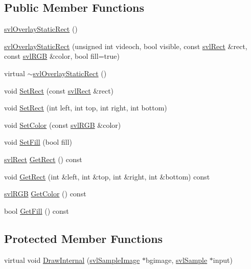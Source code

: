 \subsection*{Public Member Functions}
\begin{DoxyCompactItemize}
\item 
\hyperlink{classsvl_overlay_static_rect_ae91b11cd992ad04fa407f4ecadae7f56}{svl\+Overlay\+Static\+Rect} ()
\item 
\hyperlink{classsvl_overlay_static_rect_ae94a36da4e9d1ab24c1ffa94e637924b}{svl\+Overlay\+Static\+Rect} (unsigned int videoch, bool visible, const \hyperlink{structsvl_rect}{svl\+Rect} \&rect, const \hyperlink{structsvl_r_g_b}{svl\+R\+G\+B} \&color, bool fill=true)
\item 
virtual \hyperlink{classsvl_overlay_static_rect_a7369b65a5b1b92bc239917d9f57ebdb7}{$\sim$svl\+Overlay\+Static\+Rect} ()
\item 
void \hyperlink{classsvl_overlay_static_rect_a8ab4667a07aa9f2c26a50b28f3425ff4}{Set\+Rect} (const \hyperlink{structsvl_rect}{svl\+Rect} \&rect)
\item 
void \hyperlink{classsvl_overlay_static_rect_a5ae889711bfcec494cea4447caeebf26}{Set\+Rect} (int left, int top, int right, int bottom)
\item 
void \hyperlink{classsvl_overlay_static_rect_adc4f4ff79cc67a4a2378583df635928f}{Set\+Color} (const \hyperlink{structsvl_r_g_b}{svl\+R\+G\+B} \&color)
\item 
void \hyperlink{classsvl_overlay_static_rect_a5676e799b53a8416e67cfe0b262ee706}{Set\+Fill} (bool fill)
\item 
\hyperlink{structsvl_rect}{svl\+Rect} \hyperlink{classsvl_overlay_static_rect_a622702879d0a14e1dd167093c5e65454}{Get\+Rect} () const 
\item 
void \hyperlink{classsvl_overlay_static_rect_a2cf3e7be41151471f313f733146dd0cd}{Get\+Rect} (int \&left, int \&top, int \&right, int \&bottom) const 
\item 
\hyperlink{structsvl_r_g_b}{svl\+R\+G\+B} \hyperlink{classsvl_overlay_static_rect_aa863745fd6a47df7f841def3dba42467}{Get\+Color} () const 
\item 
bool \hyperlink{classsvl_overlay_static_rect_af3d3dfb4c83f05fad0ee38c18eed6444}{Get\+Fill} () const 
\end{DoxyCompactItemize}
\subsection*{Protected Member Functions}
\begin{DoxyCompactItemize}
\item 
virtual void \hyperlink{classsvl_overlay_static_rect_a01636348c731053ab293b562385a7c07}{Draw\+Internal} (\hyperlink{classsvl_sample_image}{svl\+Sample\+Image} $\ast$bgimage, \hyperlink{classsvl_sample}{svl\+Sample} $\ast$input)
\end{DoxyCompactItemize}
